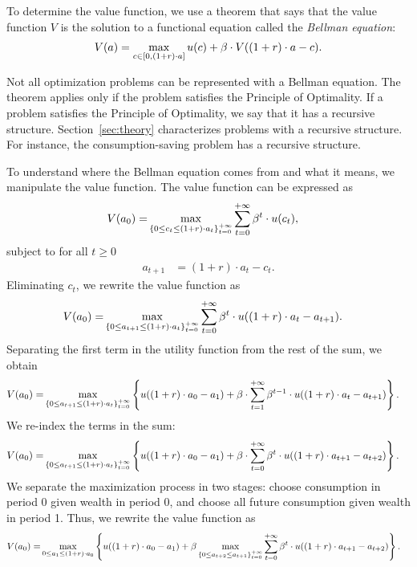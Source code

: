\documentclass[letterpaper,12pt,leqno]{article}
\begin{document}
To determine the value function, we use a theorem that says that the value function $V$ is the solution to a functional equation called the \textit{Bellman equation}:
\begin{align}
 V(a)=\max[c\in[0,(1+r)\cdot a]] u(c)+\b  \cdot V((1+r)\cdot a-c).\label{eq:recur}
\end{align}

Not all optimization problems can be represented with a Bellman equation. The theorem applies only if the problem satisfies the Principle of Optimality. If a problem satisfies the Principle of Optimality, we say that it has a recursive structure. Section~\ref{sec:theory} characterizes problems with a recursive structure. For instance, the consumption-saving problem has a recursive structure.

To understand where the Bellman equation comes from and what it means, we manipulate the value function. The value function can be expressed as
\begin{align*}
V(a_0)=&\max[\{0\leq c_t\leq (1+r)\cdot a_t\}_{t=0}^{+\infty}] \sum_{t=0}^{+\infty}\b^t  \cdot u(c_t),
\end{align*}
subject to for all $t\geq 0$
\begin{align*}
a_{t+1}&=(1+r)\cdot a_t-c_t.
\end{align*}
Eliminating $c_t$, we rewrite the value function as
\begin{align*}
V(a_0)=&\max[\{0\leq a_{t+1}\leq (1+r)\cdot a_t\}_{t=0}^{+\infty}] \sum_{t=0}^{+\infty}\b^t \cdot  u((1+r)\cdot a_t-a_{t+1}).
\end{align*}
Separating the first term in the utility function from the rest of the sum, we obtain
\begin{align*}
V(a_0)=&\max[\{0\leq a_{t+1}\leq  (1+r)\cdot a_t\}_{t=0}^{+\infty}] \bc{u((1+r)\cdot a_0-a_1)+\b \cdot \sum_{t=1}^{+\infty}\b^{t-1} \cdot u((1+r)\cdot a_t-a_{t+1})}.
\end{align*}
We re-index the terms in the sum:
\begin{align*}
V(a_0)=&\max[\{0\leq a_{t+1}\leq  (1+r)\cdot a_t\}_{t=0}^{+\infty}] \bc{u((1+r)\cdot a_0-a_1)+\b \cdot \sum_{t=0}^{+\infty}\b^{t} \cdot u((1+r)\cdot a_{t+1}-a_{t+2})}.
\end{align*}
We separate the maximization process in two stages: choose consumption in period 0 given wealth in period 0, and choose all future consumption given wealth in period 1. Thus, we rewrite the value function as
\begin{align*}
V(a_0)=&\max_{0\leq a_{1}\leq (1+r)\cdot a_0}\bc{u((1+r)\cdot a_0-a_1)+\b\max_{\{0\leq a_{t+2}\leq
a_{t+1}\}_{t=0}^{+\infty}}\sum_{t=0}^{+\infty}\b^{t} \cdot  u((1+r)\cdot a_{t+1}-a_{t+2})}.
\end{align*}
\end{document}
